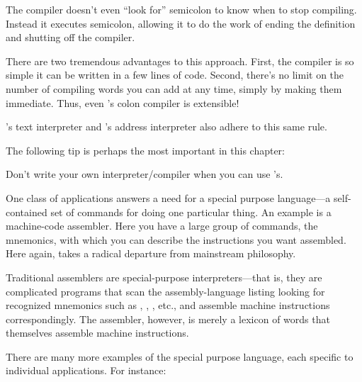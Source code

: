 The compiler doesn't even ``look for'' semicolon to know when to
stop compiling. Instead it executes semicolon, allowing it to do the work
of ending the definition and shutting off the compiler.

There are two tremendous advantages to this approach. First, the
compiler is so simple it can be written in a few lines of code. Second,
there's no limit on the number of compiling words you can add at any
time, simply by making them immediate. Thus, even \Forth{}'s colon
compiler is extensible!

\Forth{}'s text interpreter and \Forth{}'s address interpreter also
adhere to this same rule.

The following tip is perhaps the most important in this chapter:


\begin{tip}
Don't write your own interpreter/compiler when you can use \Forth{}'s.
\end{tip}
One class of applications answers a need for a special purpose
language---a self-contained set of commands for doing one particular
thing. An example is a machine-code assembler. Here you have a large
group of commands, the mnemonics, with which you can describe the
instructions you want assembled. Here again, \Forth{} takes a radical
departure from mainstream philosophy.

Traditional assemblers are special-purpose
interpreters---that is,
they are complicated programs that scan the assembly-language listing
looking for recognized mnemonics such as , , , etc., and
assemble machine instructions correspondingly. The \Forth{} assembler,
however, is merely a lexicon of \Forth{} words that themselves assemble
machine instructions.

There are many more examples of the special purpose language,
each specific to individual applications. For instance:

